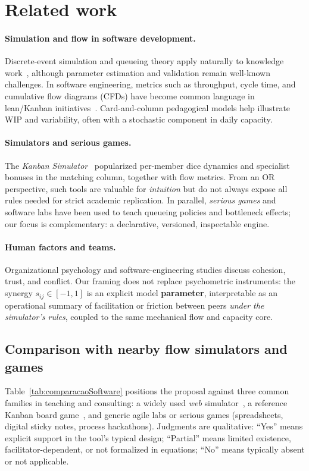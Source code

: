 \section{Related work}
\label{sec:relacionados}

\paragraph{Simulation and flow in software development.}
Discrete-event simulation and queueing theory apply naturally to knowledge work~\cite{banks2010discrete}, although parameter estimation and validation remain well-known challenges. In software engineering, metrics such as throughput, cycle time, and cumulative flow diagrams (CFDs) have become common language in lean/Kanban initiatives~\cite{anderson2010kanban}. Card-and-column pedagogical models help illustrate WIP and variability, often with a stochastic component in daily capacity.

\paragraph{Simulators and serious games.}
The \emph{Kanban Simulator}~\cite{kanbanSimulator} popularized per-member dice dynamics and specialist bonuses in the matching column, together with flow metrics. From an OR perspective, such tools are valuable for \emph{intuition} but do not always expose all rules needed for strict academic replication. In parallel, \emph{serious games} and software labs have been used to teach queueing policies and bottleneck effects; our focus is complementary: a declarative, versioned, inspectable engine.

\paragraph{Human factors and teams.}
Organizational psychology and software-engineering studies discuss cohesion, trust, and conflict. Our framing does not replace psychometric instruments: the synergy $s_{ij}\in[-1,1]$ is an explicit model \textbf{parameter}, interpretable as an operational summary of facilitation or friction between peers \emph{under the simulator's rules}, coupled to the same mechanical flow and capacity core.

\subsection{Comparison with nearby flow simulators and games}
Table~\ref{tab:comparacaoSoftware} positions the proposal against three common families in teaching and consulting: a widely used \emph{web} simulator~\cite{kanbanSimulator}, a reference Kanban board game~\cite{getkanban}, and generic agile labs or serious games (spreadsheets, digital sticky notes, process hackathons). Judgments are qualitative: ``Yes'' means explicit support in the tool's typical design; ``Partial'' means limited existence, facilitator-dependent, or not formalized in equations; ``No'' means typically absent or not applicable.

